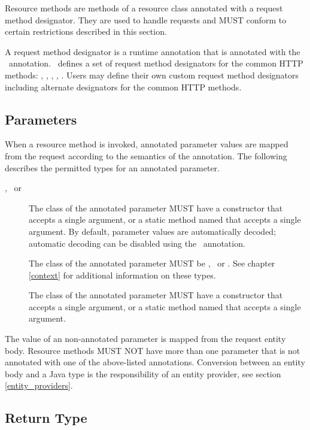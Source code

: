 Resource methods are methods of a resource class annotated with a request method designator. They are used to handle requests and MUST conform to certain restrictions described in this section.

A request method designator is a runtime annotation that is annotated with the \HttpMethod\ annotation. \jaxrs\ defines a set of request method designators for the common HTTP methods: , , , , . Users may define their own custom request method designators including alternate designators for the common HTTP methods.

\subsection{Parameters}
\label{resource_method_params}

When a resource method is invoked, annotated parameter values are mapped from the request according to the semantics of the annotation. The following describes the permitted types for an annotated parameter.
\begin{description}
\item[\MatrixParam, \QueryParam\ or \PathParam] The class of the annotated parameter MUST have a constructor that accepts a single  argument, or a static method named  that accepts a single  argument. By default, parameter values are automatically decoded; automatic decoding can be disabled using the \Encoded\ annotation.
\item[\Context] The class of the annotated parameter MUST be \UriInfo, \Request\ or \HttpHeaders. See chapter \ref{context} for additional information on these types.
\item[\HeaderParam] The class of the annotated parameter MUST have a constructor that accepts a single  argument, or a static method named  that accepts a single  argument.
\end{description}

The value of an non-annotated  parameter is mapped from the request entity body. Resource methods MUST NOT have more than one parameter that is not annotated with one of the above-listed annotations. Conversion between an entity body and a Java type is the responsibility of an entity provider, see section \ref{entity_providers}.

\subsection{Return Type}
\label{resource_method_return}

